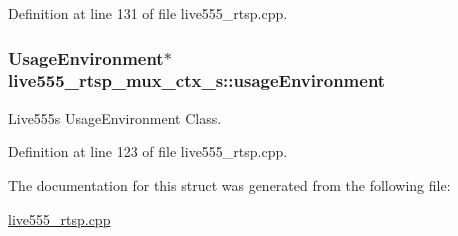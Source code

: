 Definition at line 131 of file live555\+\_\+rtsp.\+cpp.

\subsubsection[{\texorpdfstring{usage\+Environment}{usageEnvironment}}]{\setlength{\rightskip}{0pt plus 5cm}Usage\+Environment$\ast$ live555\+\_\+rtsp\+\_\+mux\+\_\+ctx\+\_\+s\+::usage\+Environment}\hypertarget{structlive555__rtsp__mux__ctx__s_aeb1c6f315ab2d2d6a7c10f014a95251a}{}\label{structlive555__rtsp__mux__ctx__s_aeb1c6f315ab2d2d6a7c10f014a95251a}
Live555\textquotesingle{}s Usage\+Environment Class. 

Definition at line 123 of file live555\+\_\+rtsp.\+cpp.



The documentation for this struct was generated from the following file\+:\begin{DoxyCompactItemize}
\item 
\hyperlink{live555__rtsp_8cpp}{live555\+\_\+rtsp.\+cpp}\end{DoxyCompactItemize}

